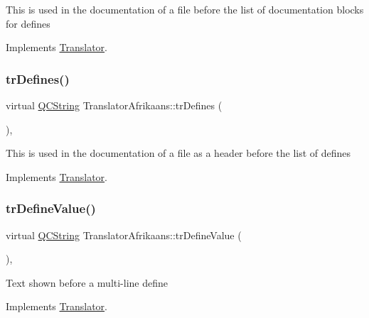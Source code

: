 This is used in the documentation of a file before the list of documentation blocks for defines 

Implements \mbox{\hyperlink{class_translator}{Translator}}.

\mbox{\label{class_translator_afrikaans_a45ef163fbd44a5dee118e0dcb6d08490}} 
\subsubsection{\texorpdfstring{trDefines()}{trDefines()}}
{\footnotesize\ttfamily virtual \mbox{\hyperlink{class_q_c_string}{Q\+C\+String}} Translator\+Afrikaans\+::tr\+Defines (\begin{DoxyParamCaption}{ }\end{DoxyParamCaption})\hspace{0.3cm}{\ttfamily [inline]}, {\ttfamily [virtual]}}

This is used in the documentation of a file as a header before the list of defines 

Implements \mbox{\hyperlink{class_translator}{Translator}}.

\mbox{\label{class_translator_afrikaans_a62ba358c2426ba90589728b6753a20dc}} 
\subsubsection{\texorpdfstring{trDefineValue()}{trDefineValue()}}
{\footnotesize\ttfamily virtual \mbox{\hyperlink{class_q_c_string}{Q\+C\+String}} Translator\+Afrikaans\+::tr\+Define\+Value (\begin{DoxyParamCaption}{ }\end{DoxyParamCaption})\hspace{0.3cm}{\ttfamily [inline]}, {\ttfamily [virtual]}}

Text shown before a multi-\/line define 

Implements \mbox{\hyperlink{class_translator}{Translator}}.

\mbox{\label{class_translator_afrikaans_a610ed67078b571a23bbcec3f4b5c4c02}} 
